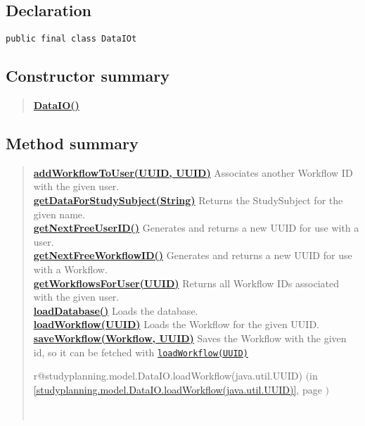 \documentclass[11pt,a4paper]{report}
\makeatletter
\newcommand{\refdefined}[1]{
\expandafter\ifx\csname r@#1\endcsname\relax
\relax\else
{$($in \ref{#1}, page \pageref{#1}$)$}\fi}
\makeatother
\begin{document}
{{{{{{{{{			\subsection{Declaration}{
			\begin{lstlisting}[frame=none]
public final class DataIOt
			\end{lstlisting}
			}
			
			\subsection{Constructor summary}{
				\begin{verse}
					\hyperlink{studyplanning.model.DataIO()}{{\bf DataIO()}} \\
				\end{verse}
			}

			\subsection{Method summary}{
				\begin{verse}
					\hyperlink{studyplanning.model.DataIO.addWorkflowToUser(java.util.UUID, java.util.UUID)}{{\bf addWorkflowToUser(UUID, UUID)}} Associates another Workflow ID with the given user.\\
					\hyperlink{studyplanning.model.DataIO.getDataForStudySubject(java.lang.String)}{{\bf getDataForStudySubject(String)}} Returns the StudySubject for the given name.\\
					\hyperlink{studyplanning.model.DataIO.getNextFreeUserID()}{{\bf getNextFreeUserID()}} Generates and returns a new UUID for use with a user.\\
					\hyperlink{studyplanning.model.DataIO.getNextFreeWorkflowID()}{{\bf getNextFreeWorkflowID()}} Generates and returns a new UUID for use with a Workflow.\\
					\hyperlink{studyplanning.model.DataIO.getWorkflowsForUser(java.util.UUID)}{{\bf getWorkflowsForUser(UUID)}} Returns all Workflow IDs associated with the given user.\\
					\hyperlink{studyplanning.model.DataIO.loadDatabase()}{{\bf loadDatabase()}} Loads the database.\\
					\hyperlink{studyplanning.model.DataIO.loadWorkflow(java.util.UUID)}{{\bf loadWorkflow(UUID)}} Loads the Workflow for the given UUID.\\
					\hyperlink{studyplanning.model.DataIO.saveWorkflow(studyplanning.model.workflow.Workflow, java.util.UUID)}{{\bf saveWorkflow(Workflow, UUID)}} Saves the Workflow with the given id, so it can be fetched with \texttt{\small \hyperlink{studyplanning.model.DataIO.loadWorkflow(java.util.UUID)}{loadWorkflow(UUID)}}{\small 
					\refdefined{studyplanning.model.DataIO.loadWorkflow(java.util.UUID)}}\\
				\end{verse}
			}
			
}}}}}}}}}
\end{document}
